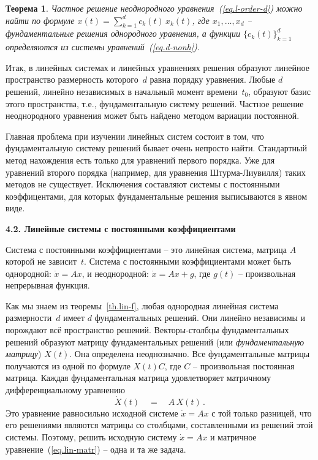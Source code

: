 \documentclass[12pt,a4paper]{article}
\newtheorem{theorem}{Теорема}
\begin{document}
 \begin{theorem}\label{th.lin-d-nonh}
Частное решение неоднородного уравнения~(\ref{eq.l-order-d}) можно найти по формуле
$x(t) = \sum_{k=1}^d c_k(t) \, x_{k}(t)$, где $x_1, \ldots , x_d$ -- фундаментальные  решения однородного уравнения, а
функции $\{c_k(t)\}_{k=1}^d$ определяются из системы уравнений~(\ref{eq.d-nonh}).
\end{theorem}

Итак, в линейных системах и линейных уравнениях решения образуют линейное пространство размерность которого~$d$ равна
порядку уравнения. Любые $d$ решений, линейно независимых в начальный момент времени~$t_0$, образуют базис этого пространства, т.е., фундаментальную систему решений. Частное решение неоднородного уравнения может быть найдено
методом вариации постоянной.
\smallskip

Главная проблема при изучении линейных систем состоит в том, что фундаментальную систему решений бывает очень непросто найти. Стандартный метод нахождения есть только для уравнений первого порядка. Уже для
уравнений второго порядка (например, для уравнения Штурма-Лиувилля) таких методов не существует. Исключения составляют системы с постоянными коэффицентами, для которых фундаментальные решения выписываются в явном виде.

\bigskip

\newpage 

\begin{center}
\textbf{4.2. Линейные системы с постоянными коэффициентами}
\end{center}
\bigskip

Система с постоянными  коэффициентами -- это линейная система, матрица $A$ которой не зависит~$t$.
 Система с постоянными коэффициентами может быть однородной: $\dot x = Ax$, и неоднородной:
 $\dot x = Ax + g$, где $g(t)$ -- произвольная непрерывная функция.

Как мы знаем из теоремы~\ref{th.lin-f}, любая однородная линейная система размерности~$d$ имеет
$d$ фундаментальных решений. Они линейно независимы и   порождают всё пространство решений.
Векторы-столбцы фундаментальных решений образуют матрицу фундаментальных решений (или {\em фундаментальную матрицу}) $X(t)$. Она определена неоднозначно. Все фундаментальные матрицы получаются из одной по формуле $X(t) C$, где $C$ -- произвольная
постоянная матрица. Каждая фундаментальная матрица удовлетворяет матричному дифференциальному уравнению
\begin{equation}\label{eq.lin-matr}
\dot X(t) \quad = \quad A\, X(t)\, .
\end{equation}
Это уравнение равносильно исходной системе $\dot x = Ax$ с той только разницей, что его решениями
являются матрицы со столбцами, составленными из решений этой системы.  Поэтому, решить исходную систему
$\dot x = Ax$ и матричное уравнение~(\ref{eq.lin-matr}) -- одна и та же задача.
\smallskip
\end{document}
